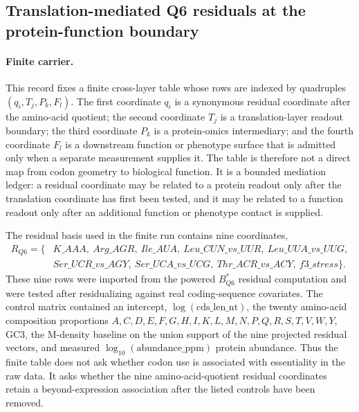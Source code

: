 \subsection{Translation-mediated Q6 residuals at the protein-function boundary}
\label{sec:q6-translation-mediated-protein-function-boundary-cross-layer}

\paragraph{Finite carrier.}
This record fixes a finite cross-layer table whose rows are indexed by quadruples $(q_i,T_j,P_k,F_l)$.  The first coordinate $q_i$ is a synonymous residual coordinate after the amino-acid quotient; the second coordinate $T_j$ is a translation-layer readout boundary; the third coordinate $P_k$ is a protein-omics intermediary; and the fourth coordinate $F_l$ is a downstream function or phenotype surface that is admitted only when a separate measurement supplies it.  The table is therefore not a direct map from codon geometry to biological function.  It is a bounded mediation ledger: a residual coordinate may be related to a protein readout only after the translation coordinate has first been tested, and it may be related to a function readout only after an additional function or phenotype contact is supplied.

The residual basis used in the finite run contains nine coordinates,
$$
\begin{aligned}
R_{Q6} = \{&K\_AAA,\ Arg\_AGR,\ Ile\_AUA,\ Leu\_CUN\_vs\_UUR,\ Leu\_UUA\_vs\_UUG,\\
&Ser\_UCR\_vs\_AGY,\ Ser\_UCA\_vs\_UCG,\ Thr\_ACR\_vs\_ACY,\ f3\_stress\}.
\end{aligned}
$$
These nine rows were imported from the powered $B^{*}_{Q6}$ residual computation and were tested after residualizing against real coding-sequence covariates.  The control matrix contained an intercept, $\log(\mathrm{cds\_len\_nt})$, the twenty amino-acid composition proportions $A,C,D,E,F,G,H,I,K,L,M,N,P,Q,R,S,T,V,W,Y$, GC3, the M-density baseline on the union support of the nine projected residual vectors, and measured $\log_{10}(\mathrm{abundance\_ppm})$ protein abundance.  Thus the finite table does not ask whether codon use is associated with essentiality in the raw data.  It asks whether the nine amino-acid-quotient residual coordinates retain a beyond-expression association after the listed controls have been removed.

